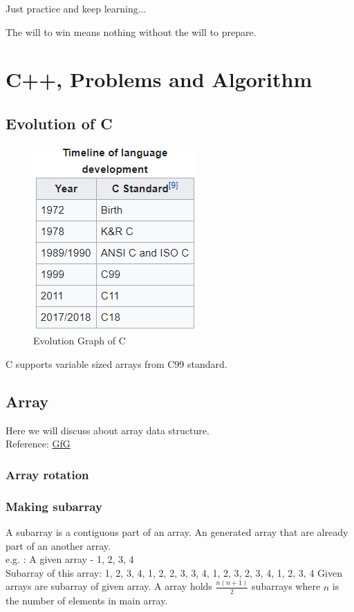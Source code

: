 \documentclass[10 pt]{book}
\begin{document}
\begin{tcolorbox}[width=7cm]
	Just practice and keep learning...
\end{tcolorbox}

\begin{flushright}
	\begin{tcolorbox}[title={Juma Ikangaa, marathoner}, colback=red!5!white, colframe=red!75!black, fonttitle=\bfseries]
		The will to win means nothing without the will to prepare.
	\end{tcolorbox}
\end{flushright}

\chapter{C++, Problems and Algorithm}
\section{Evolution of C}
\begin{figure}[hbtp]
\centering
\includegraphics[width=200 px]{Timeline of C language.png}
\caption{Evolution Graph of C}
\end{figure}
C supports variable sized arrays from C99 standard.

\section{Array}
Here we will discuss about array data structure.\\
Reference: \href{https://www.geeksforgeeks.org/array-data-structure/}{GfG}\\

\subsection{Array rotation}
\subsection{Making subarray}
A subarray is a contiguous part of an array. An generated array that are already part of an another array.\\
e.g. : A given array - {1, 2, 3, 4}\\
Subarray of this array:
{1}, {2}, {3}, {4}, {1, 2}, {2, 3}, {3, 4}, {1, 2, 3}, {2, 3, 4}, {1, 2, 3, 4}
Given arrays are subarray of given array. A array holds $\frac{n(n+1)}{2}$ subarrays where $n$ is the number of elements in main array.
\end{document}
